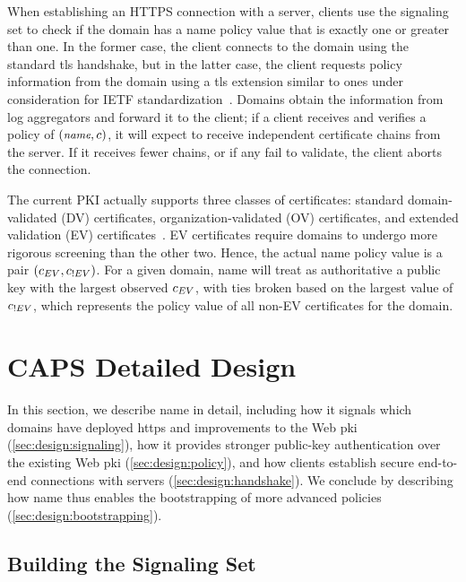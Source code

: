 When establishing an HTTPS connection with a server, clients use the
signaling set to check if the domain has a \ac{name} policy value that is
exactly one or greater than one. In the former case, the client connects to
the domain using the standard \ac{tls} handshake, but in the latter case, the
client requests policy information from the domain using a \ac{tls} extension
similar to ones under consideration for IETF 
standardization~\cite{rfc-extra-cert-1, rfc-extra-cert-2}.
Domains obtain the information from log aggregators and forward it to the
client; if a client receives and verifies a policy of $(\small{\emph{name}}, c)$, it
will expect to receive \policy independent certificate chains from the server.
If it receives fewer chains, or if any fail to validate, the client aborts
the connection.

The current PKI actually supports three classes of certificates: standard
domain-validated (DV) certificates, organization-validated (OV) certificates,
and extended validation (EV) certificates~\cite{cabf2018guidelines}. EV
certificates require domains to undergo more rigorous screening than the other
two. Hence, the actual \ac{name} policy value is a pair $(c_{EV},
c_{!EV})$. For a given domain, \ac{name} will treat as authoritative a
public key with the largest observed $c_{EV}$, with ties broken based on
the largest value of $c_{!EV}$, which represents the policy value of all
non-EV certificates for the domain.

\section{CAPS Detailed Design}

In this section, we describe \ac{name} in detail, including how it signals which
domains have deployed \ac{https} and improvements to the Web \ac{pki}
(\autoref{sec:design:signaling}), how it provides stronger public-key
authentication over the existing Web \ac{pki} (\autoref{sec:design:policy}), and
how clients establish secure end-to-end connections with servers
(\autoref{sec:design:handshake}). We conclude by describing how \ac{name} thus
enables the bootstrapping of more advanced policies
(\autoref{sec:design:bootstrapping}).

\subsection{Building the Signaling Set}
\label{sec:design:signaling}

